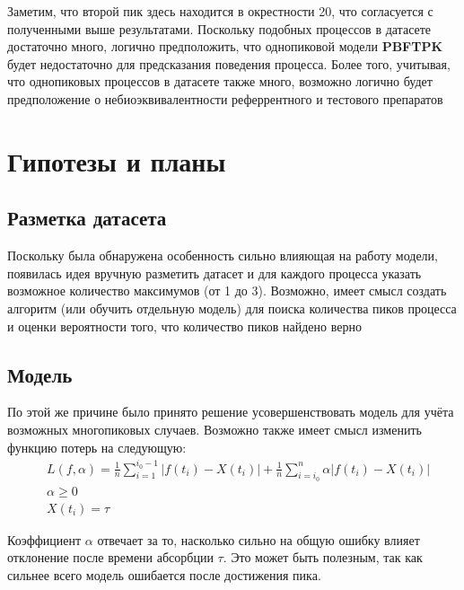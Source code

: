 \documentclass{article}
\begin{document}
Заметим, что второй пик здесь находится в окрестности 20, что согласуется с полученными выше результатами. Поскольку подобных процессов в датасете достаточно много, логично предположить, что однопиковой модели \textbf{PBFTPK} будет недостаточно для предсказания поведения процесса. Более того, учитывая, что однопиковых процессов в датасете также много, возможно логично будет предположение о небиоэквивалентности реферрентного и тестового препаратов

\section{Гипотезы и планы}

\subsection{Разметка датасета}

Поскольку была обнаружена особенность сильно влияющая на работу модели, появилась идея вручную разметить датасет и для каждого процесса указать возможное количество максимумов (от 1 до 3). Возможно, имеет смысл создать алгоритм (или обучить отдельную модель) для поиска количества пиков процесса и оценки вероятности того, что количество пиков найдено верно

\subsection{Модель}

По этой же причине было принято решение усовершенствовать модель для учёта возможных многопиковых случаев. Возможно также имеет смысл изменить функцию потерь на следующую:
\begin{align*}
	 & L(f, \alpha) = \frac{1}{n}\sum_{i=1}^{i_0-1} |f(t_i) - X(t_i)| +
	\frac{1}{n}\sum_{i=i_0}^{n} \alpha|f(t_i) - X(t_i)|                 \\
	 & \alpha \ge 0                                                     \\
	 & X(t_i) = \tau
\end{align*}

Коэффициент $\alpha$ отвечает за то, насколько сильно на общую ошибку влияет отклонение после времени абсорбции $\tau$. Это может быть полезным, так как сильнее всего модель ошибается после  достижения пика.
\end{document}

